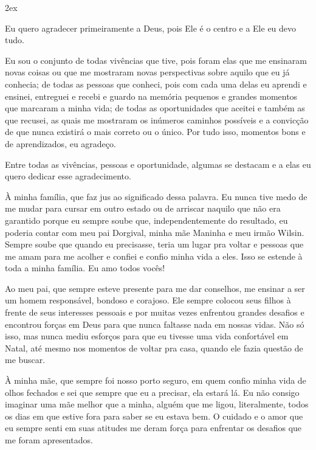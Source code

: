 \begin{trivlist}  \itemsep 2ex

  \item Eu quero agradecer primeiramente a Deus, pois Ele é o centro e a Ele eu devo tudo.

  \item Eu sou o conjunto de todas vivências que tive, pois foram elas que me ensinaram novas coisas ou que me mostraram novas perspectivas sobre aquilo que eu já conhecia; de todas as pessoas que conheci, pois com cada uma delas eu aprendi e ensinei, entreguei e recebi e guardo na memória pequenos e grandes momentos que marcaram a minha vida; de todas as oportunidades que aceitei e também as que recusei, as quais me mostraram os inúmeros caminhos possíveis e a convicção de que nunca existirá o mais correto ou o único. Por tudo isso, momentos bons e de aprendizados, eu agradeço.
  
  \item Entre todas as vivências, pessoas e oportunidade, algumas se destacam e a elas eu quero dedicar esse agradecimento.
  
  \item À minha família, que faz jus ao significado dessa palavra. Eu nunca tive medo de me mudar para cursar em outro estado ou de arriscar naquilo que não era garantido porque eu sempre soube que, independentemente do resultado, eu poderia contar com meu pai Dorgival, minha mãe Maninha e meu irmão Wilsin. Sempre soube que quando eu precisasse, teria um lugar pra voltar e pessoas que me amam para me acolher e confiei e confio minha vida a eles. Isso se estende à toda a minha família. Eu amo todos vocês!
  
  \item Ao meu pai, que sempre esteve presente para me dar conselhos, me ensinar a ser um homem responsável, bondoso e corajoso. Ele sempre colocou seus filhos à frente de seus interesses pessoais e por muitas vezes enfrentou grandes desafios e encontrou forças em Deus para que nunca faltasse nada em nossas vidas. Não só isso, mas nunca mediu esforços para que eu tivesse uma vida confortável em Natal, até mesmo nos momentos de voltar pra casa, quando ele fazia questão de me buscar.
  
  \item À minha mãe, que sempre foi nosso porto seguro, em quem confio minha vida de olhos fechados e sei que sempre que eu a precisar, ela estará lá. Eu não consigo imaginar uma mãe melhor que a minha, alguém que me ligou, literalmente, todos os dias em que estive fora para saber se eu estava bem. O cuidado e o amor que eu sempre senti em suas atitudes me deram força para enfrentar os desafios que me foram apresentados.


\end{trivlist}
